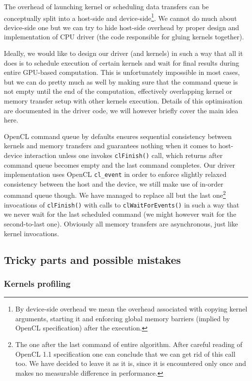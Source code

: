 The overhead of launching kernel or scheduling data transfers can be conceptually split into a host-side and device-side\footnote{By device-side overhead we mean the overhead associated with copying kernel arguments, starting it and enforcing global memory barriers (implied by OpenCL specification) after the execution.}.
We cannot do much about device-side one but we can try to hide host-side overhead by proper design and implementation of CPU driver (the code responsible for gluing kernels together).

Ideally, we would like to design our driver (and kernels) in such a way that all it does is to schedule execution of certain kernels and wait for final results during entire GPU-based computation.
This is unfortunately impossible in most cases, but we can do pretty much as well by making sure that the command queue is not empty until the end of the computation, effectively overlapping kernel or memory transfer setup with other kernels execution.
Details of this optimisation are documented in the driver code, we will however briefly cover the main idea here.

OpenCL command queue by defaults ensures sequential consistency between kernels and memory transfers and guarantees nothing when it comes to host-device interaction unless one invokes \verb+clFinish()+ call, which returns after command queue becomes empty and the last command completes.
Our driver implementation uses OpenCL \verb+cl_event+ in order to enforce slightly relaxed consistency between the host and the device, we still make use of in-order command queue though.
We have managed to replace all but the last one\footnote{The one after the last command of entire algorithm. After careful reading of OpenCL 1.1 specification one can conclude that we can get rid of this call too. We have decided to leave it as it is, since it is encountered only once and makes no measurable difference in performance.} invocations of \verb+clFinish()+ with calls to \verb+clWaitForEvents()+ in such a way that we never wait for the last scheduled command (we might however wait for the second-to-last one).
Obviously all memory transfers are asynchronous, just like
kernel invocations.

\subsection*{Tricky parts and possible mistakes}

\subsubsection*{Kernels profiling}

